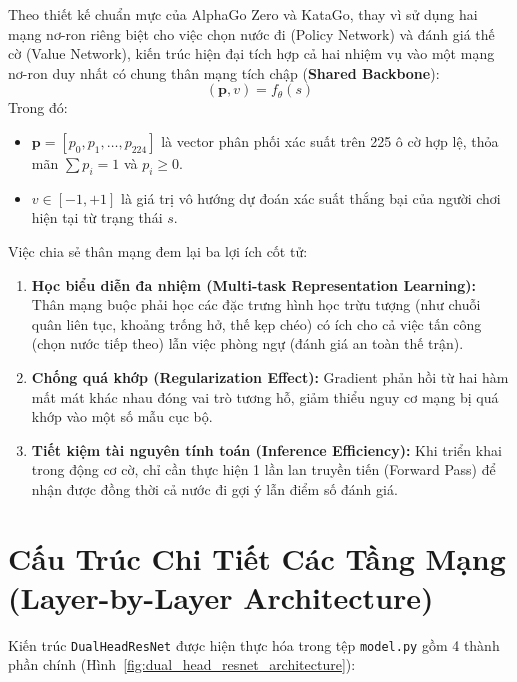 \documentclass[11pt,a4paper]{report}
\begin{document}
Theo thiết kế chuẩn mực của AlphaGo Zero và KataGo, thay vì sử dụng hai mạng nơ-ron riêng biệt cho việc chọn nước đi (Policy Network) và đánh giá thế cờ (Value Network), kiến trúc hiện đại tích hợp cả hai nhiệm vụ vào một mạng nơ-ron duy nhất có chung thân mạng tích chập (\textbf{Shared Backbone}):
\begin{equation}
    (\mathbf{p}, v) = f_\theta(s)
\end{equation}
Trong đó:
\begin{itemize}
    \item $\mathbf{p} = [p_0, p_1, \dots, p_{224}]$ là vector phân phối xác suất trên 225 ô cờ hợp lệ, thỏa mãn $\sum p_i = 1$ và $p_i \ge 0$.
    \item $v \in [-1, +1]$ là giá trị vô hướng dự đoán xác suất thắng bại của người chơi hiện tại từ trạng thái $s$.
\end{itemize}

Việc chia sẻ thân mạng đem lại ba lợi ích cốt tử:
\begin{enumerate}
    \item \textbf{Học biểu diễn đa nhiệm (Multi-task Representation Learning):} Thân mạng buộc phải học các đặc trưng hình học trừu tượng (như chuỗi quân liên tục, khoảng trống hở, thế kẹp chéo) có ích cho cả việc tấn công (chọn nước tiếp theo) lẫn việc phòng ngự (đánh giá an toàn thế trận).
    \item \textbf{Chống quá khớp (Regularization Effect):} Gradient phản hồi từ hai hàm mất mát khác nhau đóng vai trò tương hỗ, giảm thiểu nguy cơ mạng bị quá khớp vào một số mẫu cục bộ.
    \item \textbf{Tiết kiệm tài nguyên tính toán (Inference Efficiency):} Khi triển khai trong động cơ cờ, chỉ cần thực hiện 1 lần lan truyền tiến (Forward Pass) để nhận được đồng thời cả nước đi gợi ý lẫn điểm số đánh giá.
\end{enumerate}

\section{Cấu Trúc Chi Tiết Các Tầng Mạng (Layer-by-Layer Architecture)}

Kiến trúc \texttt{DualHeadResNet} được hiện thực hóa trong tệp \texttt{model.py} gồm 4 thành phần chính (Hình~\ref{fig:dual_head_resnet_architecture}):
\end{document}
